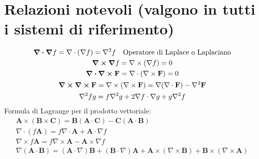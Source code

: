 \documentclass[a4paper]{scrarticle}
\begin{document}
\section {Relazioni notevoli (valgono in tutti i sistemi di riferimento)}
\begin{gather}
\div  \grad f = \nabla \cdot (\nabla f) = \nabla^2 f \quad\text{Operatore di Laplace o Laplaciano}\\
\curl \grad f = \nabla \times (\nabla f) = 0\\
\div  \curl \mathbf{F} = \nabla \cdot (\nabla \times \mathbf{F}) = 0\\
\curl \curl \mathbf{F} = \nabla \times (\nabla \times \mathbf{F}) = \nabla (\nabla \cdot \mathbf{F}) - \nabla^2 \mathbf{F}\\
\nabla^2 f g = f \nabla^2 g + 2 \nabla f \cdot \nabla g + g \nabla^2 f
\end{gather}
Formula di Lagrange per il prodotto vettoriale: 
\begin{gather}
\mathbf{A} \times (\mathbf{B} \times \mathbf{C}) = \mathbf{B} (\mathbf{A} \cdot \mathbf{C}) - \mathbf{C} (\mathbf{A} \cdot \mathbf{B})\\
\nabla\cdot(f \mathbf A)=f \nabla\cdot\mathbf A+\mathbf A\cdot\nabla f\\
\nabla\times f \mathbf A= f \nabla\times \mathbf A-\mathbf A\times \nabla f\\
\nabla ( \mathbf{A} \cdot \mathbf{B} ) 
  = ( \mathbf{A} \cdot \nabla ) \mathbf{B}
  + ( \mathbf{B} \cdot \nabla ) \mathbf{A}
  + \mathbf{A} \times ( \nabla \times \mathbf{B} )
  + \mathbf{B} \times ( \nabla \times \mathbf{A} )
\end{gather}
\end{document}
